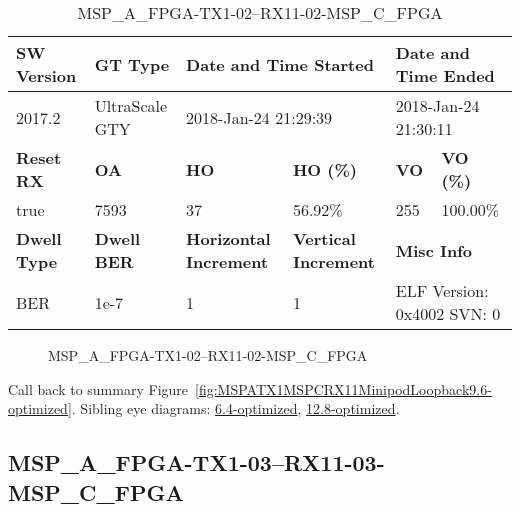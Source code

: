 \begin{table}[h]
\centering
\caption{MSP\_A\_FPGA-TX1-02--RX11-02-MSP\_C\_FPGA}
\label{tab:MSPAFPGATX102RX1102MSPCFPGA9.6-optimized}
\begin{tabular}{@{}|l|l|l|l|l|l|@{}}
\toprule
\textbf{SW Version}                & \textbf{GT Type}   & \multicolumn{2}{l|}{\textbf{Date and Time Started}}            & \multicolumn{2}{l|}{\textbf{Date and Time Ended}}        \\ \midrule
2017.2                       & UltraScale GTY          & \multicolumn{2}{l|}{2018-Jan-24 21:29:39}                   & \multicolumn{2}{l|}{2018-Jan-24 21:30:11}               \\ \midrule
\textbf{Reset RX}                  & \textbf{OA} & \textbf{HO}   & \textbf{HO (\%)} & \textbf{VO} & \textbf{VO (\%)} \\ \midrule
true & 7593        & 37          & 56.92\%        & 255        & 100.00\%       \\ \midrule
\textbf{Dwell Type}                & \textbf{Dwell BER} & \textbf{Horizontal Increment} & \textbf{Vertical Increment}    & \multicolumn{2}{l|}{\textbf{Misc Info}}                  \\ \midrule
BER                            & 1e-7        & 1        & 1           & \multicolumn{2}{l|}{ELF Version: 0x4002 SVN: 0}                         \\ \bottomrule
\end{tabular}
\end{table}

\begin{figure}[h]
\caption{MSP\_A\_FPGA-TX1-02--RX11-02-MSP\_C\_FPGA} \label{fig:MSPAFPGATX102RX1102MSPCFPGA9.6-optimized}
\end{figure}

Call back to summary Figure~\ref{fig:MSPATX1MSPCRX11MinipodLoopback9.6-optimized}.
Sibling eye diagrams: \hyperref[sec:MSPAFPGATX102RX1102MSPCFPGA6.4-optimized]{6.4-optimized}, \hyperref[sec:MSPAFPGATX102RX1102MSPCFPGA12.8-optimized]{12.8-optimized}.

\clearpage
\newpage


\subsection{MSP\_A\_FPGA-TX1-03--RX11-03-MSP\_C\_FPGA}\label{sec:MSPAFPGATX103RX1103MSPCFPGA9.6-optimized}

